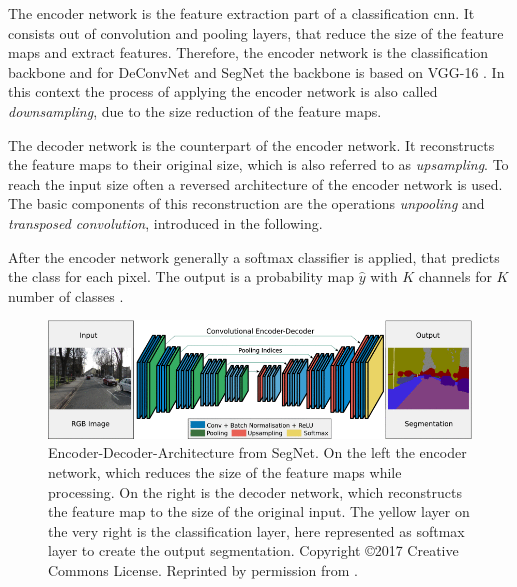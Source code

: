 The encoder network is the feature extraction part of a classification \gls{cnn}.
It consists out of convolution and pooling layers, that reduce the size of the feature maps and extract features.
Therefore, the encoder network is the classification backbone and for DeConvNet \cite{NHH15-DeConvNet} and SegNet \cite{Bad17-SegNet} the backbone is based on VGG-16 \cite{SZ15-VGG16}. 
In this context the process of applying the encoder network is also called \textit{downsampling}, due to the size reduction of the feature maps.

The decoder network is the counterpart of the encoder network.
It reconstructs the feature maps to their original size, which is also referred to as \textit{upsampling}.
To reach the input size often a reversed architecture of the encoder network is used.
The basic components of this reconstruction are the operations \textit{unpooling} and \textit{transposed convolution}, introduced in the following.

After the encoder network generally a softmax classifier is applied, that predicts the class for each pixel.
The output is a probability map $\hat{y}$ with $K$ channels for $K$ number of classes \cite{Bad17-SegNet}.

\begin{figure}
	\includegraphics[width=\linewidth]{figures/chap223_segnet_arch.png}
	\caption[Encoder-Decoder-Architecture]{
		Encoder-Decoder-Architecture from SegNet. 
		On the left the encoder network, which reduces the size of the feature maps while processing. 
		On the right is the decoder network, which reconstructs the feature map to the size of the original input. 
		The yellow layer on the very right is the classification layer, here represented as softmax layer to create the output segmentation. 
		Copyright \copyright 2017 Creative Commons License. Reprinted by permission from \cite{Bad17-SegNet}.}
	\label{fig:ch2:sec2:encoder-decoder}
\end{figure}

